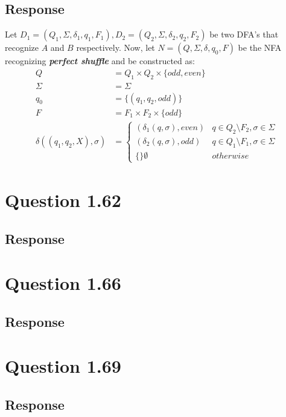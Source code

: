 \documentclass[13pt]{article}
\begin{document}
\subsection*{Response}
Let $D_1 = (Q_1, \Sigma, \delta_1, q_1, F_1), D_2 = (Q_2, \Sigma,
\delta_2, q_2, F_2)$ be two DFA's that recognize $A$ and $B$
respectively. Now, let $N = (Q, \Sigma, \delta, q_0, F)$ be the NFA
recognizing \textit{\textbf{perfect shuffle}} and be constructed as:
\begin{align*}
  Q &= Q_1 \times Q_2 \times \{odd, even\} \\
  \Sigma &= \Sigma \\
  q_0 &= \{(q_1, q_2, odd)\} \\
  F &= F_1 \times F_2 \times \{odd\} \\
  \delta((q_1, q_2, X), \sigma) &=
           \begin{cases}
             (\delta_1(q, \sigma), even) & q \in Q_2 \setminus F_2, \sigma
                                       \in \Sigma \\
             (\delta_2(q, \sigma), odd) & q \in Q_1 \setminus F_1, \sigma
                                       \in \Sigma \\
             \{\}
             \emptyset & otherwise
           \end{cases}
\end{align*}

\newpage
\section*{Question 1.62}
\subsection*{Response}

\newpage
\section*{Question 1.66}
\subsection*{Response}

\newpage
\section*{Question 1.69}
\subsection*{Response}
\end{document}
